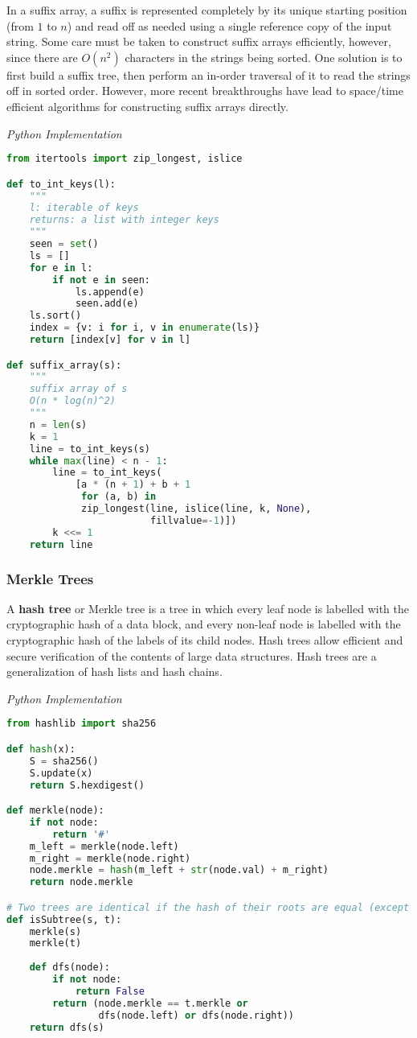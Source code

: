 \documentclass{article}
\begin{document}
    In a suffix array, a suffix is represented completely by its unique starting position (from $1$ to $n$) and read off as needed using a single reference copy of the input string. Some care must be taken to construct suffix arrays efficiently, however, since there are $O(n^2)$ characters in the strings being sorted. One solution is to first build a suffix tree, then perform an in-order traversal of it to read the strings off in sorted order. However, more recent breakthroughs have lead to space/time efficient algorithms for constructing suffix arrays directly.

\vspace{8pt} \emph{Python Implementation}
\begin{lstlisting}[language=Python]
from itertools import zip_longest, islice

def to_int_keys(l):
    """
    l: iterable of keys
    returns: a list with integer keys
    """
    seen = set()
    ls = []
    for e in l:
        if not e in seen:
            ls.append(e)
            seen.add(e)
    ls.sort()
    index = {v: i for i, v in enumerate(ls)}
    return [index[v] for v in l]

def suffix_array(s):
    """
    suffix array of s
    O(n * log(n)^2)
    """
    n = len(s)
    k = 1
    line = to_int_keys(s)
    while max(line) < n - 1:
        line = to_int_keys(
            [a * (n + 1) + b + 1
             for (a, b) in
             zip_longest(line, islice(line, k, None),
                         fillvalue=-1)])
        k <<= 1
    return line
\end{lstlisting}
    
    \subsubsection{Merkle Trees}
    A \textbf{hash tree} or Merkle tree is a tree in which every leaf node is labelled with the cryptographic hash of a data block, and every non-leaf node is labelled with the cryptographic hash of the labels of its child nodes. Hash trees allow efficient and secure verification of the contents of large data structures. Hash trees are a generalization of hash lists and hash chains.
    
\vspace{8pt} \emph{Python Implementation}
\begin{lstlisting}[language=Python]
from hashlib import sha256

def hash(x):
    S = sha256()
    S.update(x)
    return S.hexdigest()

def merkle(node):
    if not node:
        return '#'
    m_left = merkle(node.left)
    m_right = merkle(node.right)
    node.merkle = hash(m_left + str(node.val) + m_right)
    return node.merkle

# Two trees are identical if the hash of their roots are equal (except for collisions)
def isSubtree(s, t):
    merkle(s)
    merkle(t)
    
    def dfs(node):
        if not node:
            return False
        return (node.merkle == t.merkle or
                dfs(node.left) or dfs(node.right))
    return dfs(s)
\end{lstlisting}
\end{document}
